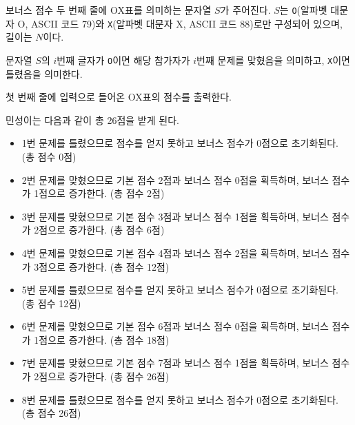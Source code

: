 \begin{problem}{보너스 점수}
    두 번째 줄에 OX표를 의미하는 문자열 $ S $가 주어진다. $ S $는 \verb|O|(알파벳 대문자 O, ASCII 코드 79)와 \verb|X|(알파벳 대문자 X, ASCII 코드 88)로만 구성되어 있으며, 길이는 $ N $이다.
    
    문자열 $ S $의 $ i $번째 글자가 \verb|O|이면 해당 참가자가 $ i $번째 문제를 맞혔음을 의미하고, \verb|X|이면 틀렸음을 의미한다.
    
    \OutputFile
    첫 번째 줄에 입력으로 들어온 OX표의 점수를 출력한다.
    
    \Examples
    
    \begin{example}
    \end{example}
    
    \Explanation
    민성이는 다음과 같이 총 26점을 받게 된다.
    \begin{itemize}
        \item 1번 문제를 틀렸으므로 점수를 얻지 못하고 보너스 점수가 0점으로 초기화된다. (총 점수 0점)
        \item 2번 문제를 맞혔으므로 기본 점수 2점과 보너스 점수 0점을 획득하며, 보너스 점수가 1점으로 증가한다. (총 점수 2점)
        \item 3번 문제를 맞혔으므로 기본 점수 3점과 보너스 점수 1점을 획득하며, 보너스 점수가 2점으로 증가한다. (총 점수 6점)
        \item 4번 문제를 맞혔으므로 기본 점수 4점과 보너스 점수 2점을 획득하며, 보너스 점수가 3점으로 증가한다. (총 점수 12점)
        \item 5번 문제를 틀렸으므로 점수를 얻지 못하고 보너스 점수가 0점으로 초기화된다. (총 점수 12점)
        \item 6번 문제를 맞혔으므로 기본 점수 6점과 보너스 점수 0점을 획득하며, 보너스 점수가 1점으로 증가한다. (총 점수 18점)
        \item 7번 문제를 맞혔으므로 기본 점수 7점과 보너스 점수 1점을 획득하며, 보너스 점수가 2점으로 증가한다. (총 점수 26점)
        \item 8번 문제를 틀렸으므로 점수를 얻지 못하고 보너스 점수가 0점으로 초기화된다. (총 점수 26점)
    \end{itemize}
        
    
\end{problem}

